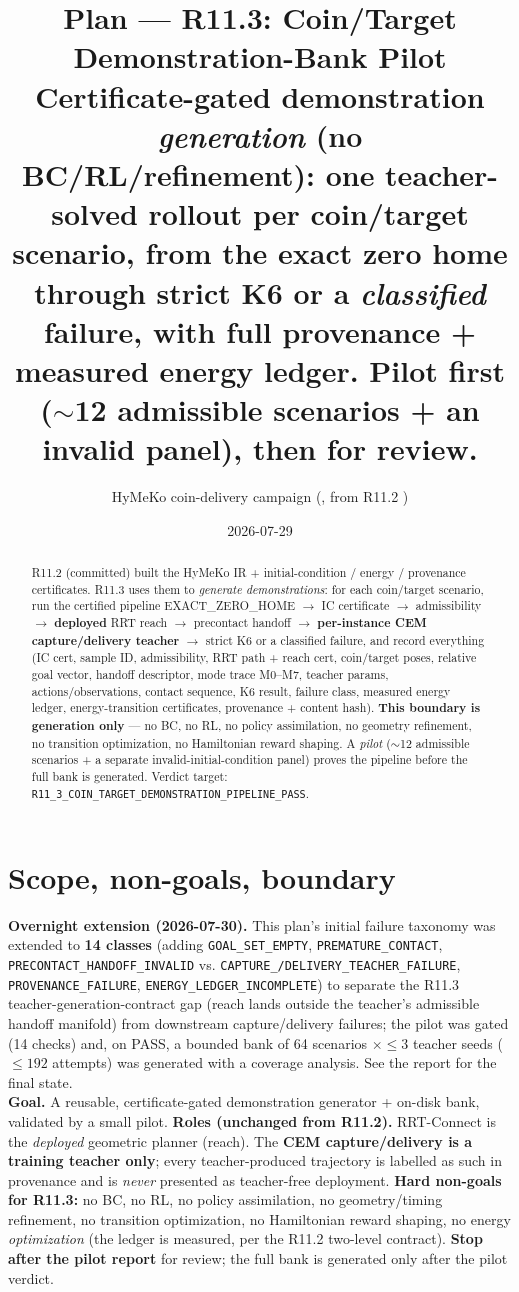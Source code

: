 \documentclass[11pt]{article}
\title{\textbf{Plan --- R11.3: Coin/Target Demonstration-Bank Pilot}\\[2pt]
\large Certificate-gated demonstration \emph{generation} (no BC/RL/refinement): one teacher-solved rollout per
coin/target scenario, from the exact zero home through strict K6 or a \emph{classified} failure, with full provenance +
measured energy ledger. Pilot first (\(\sim\)12 admissible scenarios + an invalid panel), then \halt{} for review.}
\author{HyMeKo coin-delivery campaign \quad(\code{feature/r11-3-coin-target-demo-bank}, from R11.2 \code{fb5b43a2})}
\date{2026-07-29}
\newcommand{\code}[1]{\texttt{\small #1}}
\newcommand{\gate}[1]{\textcolor{blue!55!black}{\texttt{\small #1}}}
\begin{document}
\maketitle

\begin{abstract}
\noindent R11.2 (committed) built the HyMeKo IR + initial-condition / energy / provenance certificates. R11.3 uses them to
\emph{generate demonstrations}: for each coin/target scenario, run the certified pipeline EXACT\_ZERO\_HOME $\to$ IC
certificate $\to$ admissibility $\to$ \textbf{deployed} RRT reach $\to$ precontact handoff $\to$ \textbf{per-instance CEM
capture/delivery teacher} $\to$ strict K6 or a classified failure, and record everything (IC cert, sample ID, admissibility,
RRT path + reach cert, coin/target poses, relative goal vector, handoff descriptor, mode trace M0--M7, teacher params,
actions/observations, contact sequence, K6 result, failure class, measured energy ledger, energy-transition certificates,
provenance + content hash). \textbf{This boundary is generation only} --- no BC, no RL, no policy assimilation, no geometry
refinement, no transition optimization, no Hamiltonian reward shaping. A \emph{pilot} ($\sim$12 admissible scenarios + a
separate invalid-initial-condition panel) proves the pipeline before the full bank is generated. Verdict target:
\gate{R11\_3\_COIN\_TARGET\_DEMONSTRATION\_PIPELINE\_PASS}.
\end{abstract}

\section{Scope, non-goals, boundary}
\textbf{Overnight extension (2026-07-30).} This plan's initial failure taxonomy was extended to \textbf{14 classes}
(adding \code{GOAL\_SET\_EMPTY}, \code{PREMATURE\_CONTACT}, \code{PRECONTACT\_HANDOFF\_INVALID} vs.
\code{CAPTURE\_/DELIVERY\_TEACHER\_FAILURE}, \code{PROVENANCE\_FAILURE}, \code{ENERGY\_LEDGER\_INCOMPLETE}) to separate the
R11.3 teacher-generation-contract gap (reach lands outside the teacher's admissible handoff manifold) from downstream
capture/delivery failures; the pilot was gated (14 checks) and, on PASS, a bounded bank of 64 scenarios $\times \leq 3$
teacher seeds ($\leq 192$ attempts) was generated with a coverage analysis. See the report for the final state.\\[2pt]
\textbf{Goal.} A reusable, certificate-gated demonstration generator + on-disk bank, validated by a small pilot.
\textbf{Roles (unchanged from R11.2).} RRT-Connect is the \emph{deployed} geometric planner (reach). The \textbf{CEM
capture/delivery is a training teacher only}; every teacher-produced trajectory is labelled as such in provenance and is
\emph{never} presented as teacher-free deployment. \textbf{Hard non-goals for R11.3:} no BC, no RL, no policy assimilation,
no geometry/timing refinement, no transition optimization, no Hamiltonian reward shaping, no energy \emph{optimization}
(the ledger is measured, per the R11.2 two-level contract). \textbf{Stop after the pilot report} for review; the full bank
is generated only after the pilot verdict.
\end{document}
